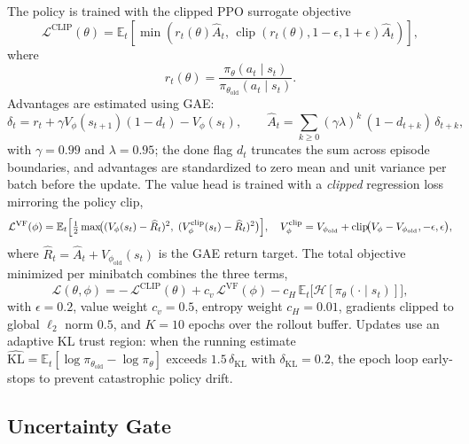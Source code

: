 \documentclass[10pt]{article}
\newcommand{\E}{\mathbb{E}}
\newcommand{\clip}{\operatorname{clip}}
\begin{document}
The policy is trained with the clipped PPO surrogate objective
\[
	\mathcal{L}^{\mathrm{CLIP}}(\theta)
	=
	\E_t\left[
		\min\left(
		r_t(\theta)\widehat{A}_t,\,
		\clip(r_t(\theta),1-\epsilon,1+\epsilon)\widehat{A}_t
		\right)
		\right],
\]
where
\[
	r_t(\theta)=\frac{\pi_\theta(a_t\mid s_t)}
	{\pi_{\theta_{\mathrm{old}}}(a_t\mid s_t)}.
\]
Advantages are estimated using GAE:
\[
	\delta_t = r_t + \gamma V_\phi(s_{t+1})(1-d_t)-V_\phi(s_t),
	\qquad
	\widehat{A}_t=\sum_{k\ge 0}(\gamma\lambda)^k\,(1-d_{t+k})\,\delta_{t+k},
\]
with \(\gamma=0.99\) and \(\lambda=0.95\); the done flag \(d_t\) truncates the sum across
episode boundaries, and advantages are standardized to zero mean and unit variance per batch
before the update. The value head is trained with a \emph{clipped} regression loss mirroring
the policy clip,
\[
	\mathcal{L}^{\mathrm{VF}}(\phi)
	=
	\E_t\Bigl[\tfrac12\max\!\bigl(
		(V_\phi(s_t)-\widehat{R}_t)^2,\;
		(V_\phi^{\mathrm{clip}}(s_t)-\widehat{R}_t)^2
	\bigr)\Bigr],
	\quad
	V_\phi^{\mathrm{clip}}=V_{\phi_{\mathrm{old}}}+\clip\!\bigl(V_\phi-V_{\phi_{\mathrm{old}}},-\epsilon,\epsilon\bigr),
\]
where \(\widehat{R}_t=\widehat{A}_t+V_{\phi_{\mathrm{old}}}(s_t)\) is the GAE return target. The
total objective minimized per minibatch combines the three terms,
\[
	\mathcal{L}(\theta,\phi)
	=
	-\,\mathcal{L}^{\mathrm{CLIP}}(\theta)
	+ c_v\,\mathcal{L}^{\mathrm{VF}}(\phi)
	- c_H\,\E_t\bigl[\mathcal{H}[\pi_\theta(\cdot\mid s_t)]\bigr],
\]
with \(\epsilon=0.2\), value weight \(c_v=0.5\), entropy weight \(c_H=0.01\), gradients clipped
to global \(\ell_2\) norm \(0.5\), and \(K=10\) epochs over the rollout buffer. Updates use an
adaptive KL trust region: when the running estimate
\(\widehat{\mathrm{KL}}=\E_t[\log\pi_{\theta_{\mathrm{old}}}-\log\pi_\theta]\) exceeds
\(1.5\,\delta_{\mathrm{KL}}\) with \(\delta_{\mathrm{KL}}=0.2\), the epoch loop early-stops to
prevent catastrophic policy drift.

\subsection{Uncertainty Gate}
\label{subsec:gate}
\end{document}
